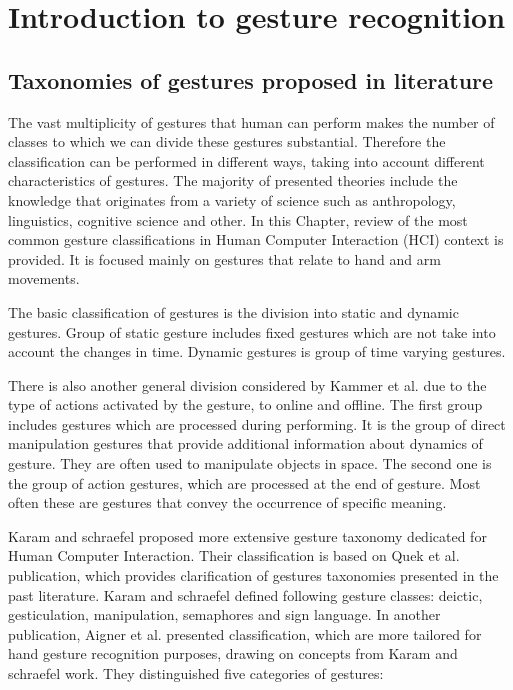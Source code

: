 \chapter{Introduction to gesture recognition}

\section{Taxonomies of gestures proposed in literature}
The vast multiplicity of gestures that human can perform makes the number of classes to which we can divide these gestures substantial. Therefore the classification can be performed in different ways, taking into account different characteristics of gestures. The majority of presented theories include the knowledge that originates from a variety of science such as anthropology, linguistics, cognitive science and other. In this Chapter, review of the most common gesture classifications in Human Computer Interaction (HCI) context is provided. It is focused mainly on gestures that relate to hand and arm movements.

The basic classification of gestures is the division into static and dynamic gestures. Group of static gesture includes fixed gestures which are not take into account the changes in time. Dynamic gestures is group of time varying gestures.

There is also another general division considered by Kammer et al. \cite{kammer_taxonomy_2010} due to the type of actions activated by the gesture, to online and offline. The first group includes gestures which are processed during performing. It is the group of direct manipulation gestures that provide additional information about dynamics of gesture. They are often used to manipulate objects in space. The second one is the group of action gestures, which are processed at the end of gesture. Most often these are gestures that convey the occurrence of specific meaning.

Karam and schraefel \cite{Karam05ataxonomy} proposed more extensive gesture taxonomy dedicated for Human Computer Interaction. Their classification is based on Quek et al. \cite{Quek:2002:MHD:568513.568514} publication, which provides clarification of gestures taxonomies presented in the past literature. Karam and schraefel defined following gesture classes: deictic, gesticulation, manipulation, semaphores and sign language. In another publication, Aigner et al. \cite{AignerTaxonomy} presented classification, which are more tailored for hand gesture recognition purposes, drawing on concepts from Karam and schraefel work. They distinguished five categories of gestures:

